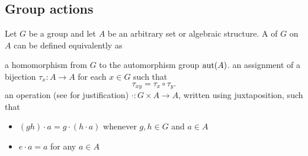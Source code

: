 \subsection{Group actions}\label{subsec:group_actions}

\begin{definition}\label{def:left_group_action}\cite[159]{Knapp2016BAlg}
  Let \( G \) be a group and let \( A \) be an arbitrary set or algebraic structure. A  of \( G \) on \( A \) can be defined equivalently as
  \begin{defenum}
     a homomorphism from \( G \) to the automorphism group \( \operatorname{aut}(A) \).
     an assignment of a bijection \( \tau_x: A \to A \) for each \( x \in G \) such that
    \begin{equation*}
      \tau_{xy} = \tau_x \circ \tau_y.
    \end{equation*}
     an operation (see  for justification) \( \cdot: G \times A \to A \), written using juxtaposition, such that
    \begin{itemize}
      \item \( (g h) \cdot a = g \cdot (h \cdot a) \) whenever \( g, h \in G \) and \( a \in A \)
      \item \( e \cdot a = a \) for any \( a \in A \)
    \end{itemize}
  \end{defenum}
\end{definition}
